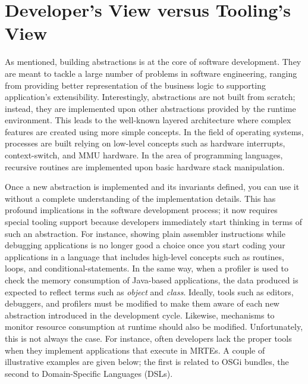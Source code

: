 \section{Developer's View versus Tooling's View} \label{sec:chapter2-introduction}

As mentioned, building abstractions is at the core of software development.
They are meant to tackle a large number of problems in software engineering, ranging from providing better representation of the business logic to supporting application's extensibility.
Interestingly, abstractions are not built from scratch; instead, they are implemented upon other abstractions provided by the runtime environment.
This leads to the well-known layered architecture where complex features are created using more simple concepts.
In the field of operating systems, processes are built relying on low-level concepts such as hardware interrupts, context-switch, and MMU hardware.
In the area of programming languages, recursive routines are implemented upon basic hardware stack manipulation.

Once a new abstraction is implemented and its invariants defined, you can use it without a complete understanding of the implementation details.
This has profound implications in the software development process; it now requires special tooling support because developers immediately start thinking in terms of such an abstraction.
For instance, showing plain assembler instructions while debugging applications is no longer good a choice once you start coding your applications in a language that includes high-level concepts such as routines, loops, and conditional-statements.
In the same way, when a profiler is used to check the memory consumption of Java-based applications, the data produced is expected to reflect terms such as \textit{object} and \textit{class}.
Ideally, tools such as editors, debuggers, and profilers must be modified to make them aware of each new abstraction introduced in the development cycle.
Likewise, mechanisms to monitor resource consumption at runtime should also be modified.
Unfortunately, this is not always the case.
For instance, often developers lack the proper tools when they implement applications that execute in MRTEs.
A couple of illustrative examples are given below; the first is related to OSGi bundles, the second to Domain-Specific Languages (DSLs).


